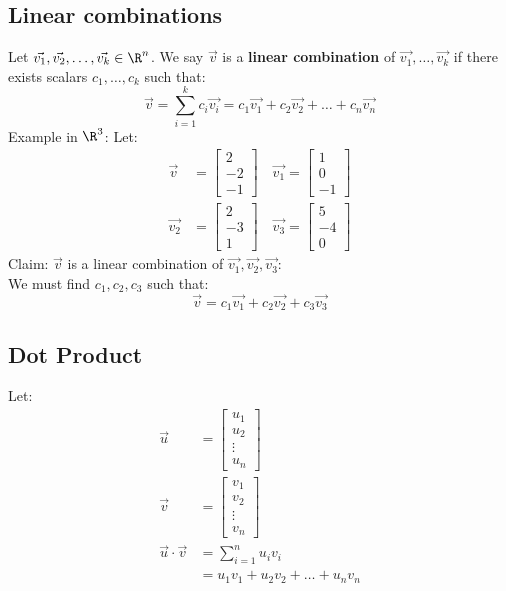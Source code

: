 \documentclass[letterpaper, 12pt]{math}
\begin{document}
\subsection*{Linear combinations}
Let \( \vec{v_{1}},\vec{v_{2}},\dots,\vec{v_{k}}\in\R^{n} \). We say
\( \vec{v} \) is a \textbf{linear combination} of
\( \vec{v_{1}},\dots,\vec{v_{k}} \) if there exists scalars
\( c_{1},\dots,c_{k} \) such that:
\[ \vec{v} = \sum_{i=1}^{k}c_{i}\vec{v_{i}} =
  c_{1}\vec{v_{1}}+c_{2}\vec{v_{2}}+\dots+c_{n}\vec{v_{n}} \]
Example in \( \R^{3} \):
Let:
\begin{align*}
  \vec{v} &=
    \begin{bmatrix}
      2 \\ -2 \\ -1
    \end{bmatrix} \quad
  \vec{v_{1}} =
    \begin{bmatrix}
      1 \\ 0 \\ -1
    \end{bmatrix} \\
  \vec{v_{2}} &=
    \begin{bmatrix}
      2 \\ -3 \\ 1
    \end{bmatrix} \quad
  \vec{v_{3}} =
    \begin{bmatrix}
      5 \\ -4 \\ 0
    \end{bmatrix}
\end{align*}
Claim: \( \vec{v} \) is a linear combination of
\( \vec{v_{1}},\vec{v_{2}},\vec{v_{3}} \): \\
We must find \( c_{1},c_{2},c_{3} \) such that:
\[ \vec{v} = c_{1}\vec{v_{1}}+c_{2}\vec{v_{2}}+c_{3}\vec{v_{3}} \]

\subsection*{Dot Product}
Let:
\begin{align*}
  \vec{u} &=
    \begin{bmatrix}
      u_{1} \\ u_{2} \\ \vdots \\ u_{n}
    \end{bmatrix} \\
  \vec{v} &=
    \begin{bmatrix}
      v_{1} \\ v_{2} \\ \vdots \\ v_{n}
    \end{bmatrix} \\
  \vec{u}\cdot\vec{v} &= \sum_{i=1}^{n}u_{i}v_{i} \\
  &= u_{1}v_{1}+u_{2}v_{2}+\dots+u_{n}v_{n}
\end{align*}
\end{document}
